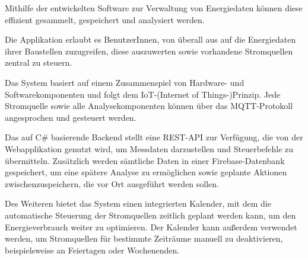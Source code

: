 Mithilfe der entwickelten Software zur Verwaltung von Energiedaten können diese effizient gesammelt, gespeichert und analysiert werden.

Die Applikation erlaubt es BenutzerInnen, von überall aus auf die Energiedaten ihrer Baustellen zuzugreifen, diese auszuwerten sowie vorhandene Stromquellen zentral zu steuern.

Das System basiert auf einem Zusammenspiel von Hardware- und Softwarekomponenten und folgt dem IoT-(Internet of Things-)Prinzip. Jede Stromquelle sowie alle Analysekomponenten können über das MQTT-Protokoll angesprochen und gesteuert werden.

Das auf C\# basierende Backend stellt eine REST-API zur Verfügung, die von der Webapplikation genutzt wird, um Messdaten darzustellen und Steuerbefehle zu übermitteln. Zusätzlich werden sämtliche Daten in einer Firebase-Datenbank gespeichert, um eine spätere Analyse zu ermöglichen sowie geplante Aktionen zwischenzuspeichern, die vor Ort ausgeführt werden sollen.

Des Weiteren bietet das System einen integrierten Kalender, mit dem die automatische Steuerung der Stromquellen zeitlich geplant werden kann, um den Energieverbrauch weiter zu optimieren. Der Kalender kann außerdem verwendet werden, um Stromquellen für bestimmte Zeiträume manuell zu deaktivieren, beispielsweise an Feiertagen oder Wochenenden.

